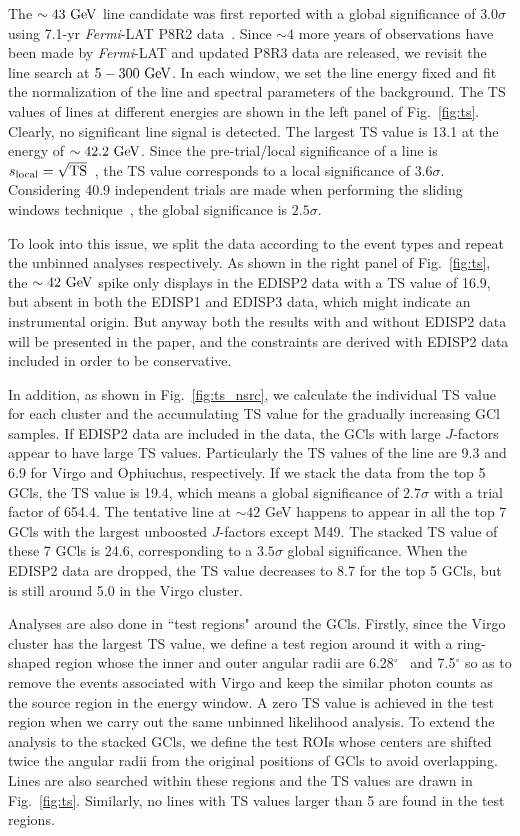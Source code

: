 \documentclass[
	twocolumn,
]{aastex6} %
\newcommand{\lat}{\emph{Fermi}-LAT\xspace}
\renewcommand{\deg}{\ensuremath{^{\circ}}\xspace}
\begin{document}
The $\sim 43~\rm GeV$ line candidate was first reported with a global significance of $3.0\sigma$ using 7.1-yr \lat P8R2 data~\citep{Liang2016}.
Since $\sim 4$ more years of observations have been made by \lat and updated P8R3 data are released, we revisit the line search at $5-300~\rm GeV$.
In each window, we set the line energy fixed and fit the normalization of the line and spectral parameters of the background.
The TS values of lines at different energies are shown in the left panel of Fig.~\ref{fig:ts}.
Clearly, no significant line signal is detected.
The largest TS value is 13.1 at the energy of $\sim 42.2~\rm GeV$.
Since the pre-trial/local significance of a line is $s_{\rm local}=\sqrt{\rm TS}$~\citep{Ackermann2013a}, the TS value corresponds to a local significance of $3.6\sigma$.
Considering 40.9 independent trials are made when performing the sliding windows technique~\citep{Liang2016}, the global significance is $2.5\sigma$.

To look into this issue, we split the data according to the event types and repeat the unbinned analyses respectively.
As shown in the right panel of Fig.~\ref{fig:ts}, the $\sim 42~\rm GeV$ spike only displays in the EDISP2 data with a TS value of 16.9, but absent in both the EDISP1 and EDISP3 data, which might indicate an instrumental origin.
But anyway both the results with and without EDISP2 data will be presented in the paper, and the constraints are derived with EDISP2 data included in order to be conservative.

In addition, as shown in Fig.~\ref{fig:ts_nsrc}, we calculate the individual TS value for each cluster and the accumulating TS value for the gradually increasing GCl samples.
If EDISP2 data are included in the data, the GCls with large $J$-factors appear to have large TS values.
Particularly the TS values of the line are 9.3 and 6.9 for Virgo and Ophiuchus, respectively.
If we stack the data from the top 5 GCls, the TS value is 19.4, which means a global significance of $2.7\sigma$ with a trial factor of 654.4.
The tentative line at $\sim 42$ GeV happens to appear in all the top 7 GCls with the largest unboosted $J$-factors except M49.
The stacked TS value of these 7 GCls is 24.6, corresponding to a $3.5\sigma$ global significance.
When the EDISP2 data are dropped, the TS value decreases to 8.7 for the top 5 GCls, but is still around 5.0 in the Virgo cluster.

Analyses are also done in ``test regions" around the GCls.
Firstly, since the Virgo cluster has the largest TS value, we define a test region around it with a ring-shaped region whose the inner and outer angular radii are 6.28\deg~\citep{Anderson2016} and 7.5\deg so as to remove the events associated with Virgo and keep the similar photon counts as the source region in the energy window.
A zero TS value is achieved in the test region when we carry out the same unbinned likelihood analysis.
To extend the analysis to the stacked GCls, we define the test ROIs whose centers are shifted twice the angular radii from the original positions of GCls to avoid overlapping.
Lines are also searched within these regions and the TS values are drawn in Fig.~\ref{fig:ts}.
Similarly, no lines with TS values larger than 5 are found in the test regions.
\end{document}
